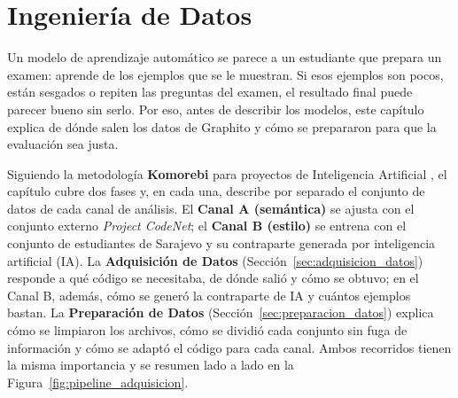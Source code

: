 \chapter{Ingeniería de Datos}
\label{cap:ingenieria_datos}

Un modelo de aprendizaje automático se parece a un estudiante que prepara un examen: aprende de los ejemplos que se le muestran. Si esos ejemplos son pocos, están sesgados o repiten las preguntas del examen, el resultado final puede parecer bueno sin serlo. Por eso, antes de describir los modelos, este capítulo explica de dónde salen los datos de Graphito y cómo se prepararon para que la evaluación sea justa.

Siguiendo la metodología \textbf{Komorebi} para proyectos de Inteligencia Artificial \cite{verges_como_2023}, el capítulo cubre dos fases y, en cada una, describe por separado el conjunto de datos de cada canal de análisis. El \textbf{Canal A (semántica)} se ajusta con el conjunto externo \textit{Project CodeNet}; el \textbf{Canal B (estilo)} se entrena con el conjunto de estudiantes de Sarajevo y su contraparte generada por inteligencia artificial (IA). La \textbf{Adquisición de Datos} (Sección~\ref{sec:adquisicion_datos}) responde a qué código se necesitaba, de dónde salió y cómo se obtuvo; en el Canal B, además, cómo se generó la contraparte de IA y cuántos ejemplos bastan. La \textbf{Preparación de Datos} (Sección~\ref{sec:preparacion_datos}) explica cómo se limpiaron los archivos, cómo se dividió cada conjunto sin fuga de información y cómo se adaptó el código para cada canal. Ambos recorridos tienen la misma importancia y se resumen lado a lado en la Figura~\ref{fig:pipeline_adquisicion}.

